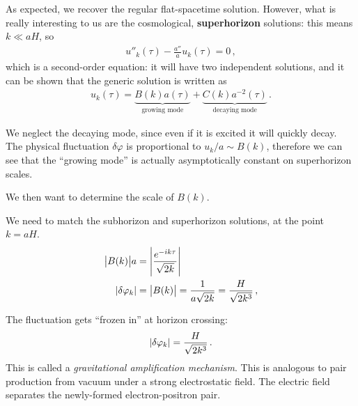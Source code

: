 \documentclass[main.tex]{subfiles}
\begin{document}
As expected, we recover the regular flat-spacetime solution.
However, what is really interesting to us are the cosmological, \textbf{superhorizon} solutions: this means \(k \ll a H\), so 
%
\begin{align}
u''_k (\tau ) - \frac{a''}{a} u_k (\tau ) = 0
\,,
\end{align}
%
which is a second-order equation: it will have two independent solutions, and it can be shown that the generic solution is written as 
%
\begin{align}
u_k(\tau ) = \underbrace{B(k) a(\tau )}_{\text{growing mode}} + \underbrace{C(k) a^{-2}(\tau )}_{\text{decaying mode}}
\,.
\end{align}

We neglect the decaying mode, since even if it is excited it will quickly decay.
The physical fluctuation \(\delta \varphi \) is proportional to \(u_k /a \sim B(k)\), therefore we can see that the ``growing mode'' is actually asymptotically constant on superhorizon scales. 

We then want to determine the scale of \(B(k)\). 

We need to match the subhorizon and superhorizon solutions, at the point \(k = aH\). 
%
\begin{align}
\abs{B(k)} a &= \abs{\frac{e^{-ik \tau }}{\sqrt{2 k}}}   \\
\abs{ \delta \varphi _k} &= \abs{B(k)} = \frac{1}{a \sqrt{2k}} 
= \frac{H}{\sqrt{2 k^3}}
\,,
\end{align}
%

The fluctuation gets ``frozen in'' at horizon crossing: 
%
\begin{align}
\abs{ \delta \varphi _k} = \frac{H}{\sqrt{2 k^3}}
\,.
\end{align}
%
This is called a \emph{gravitational amplification mechanism}.
This is analogous to pair production from vacuum under a strong electrostatic field. The electric field separates the newly-formed electron-positron pair. 
\end{document}
